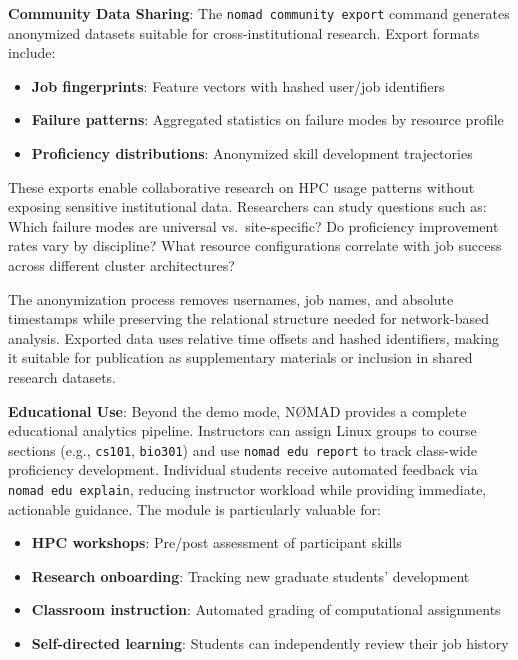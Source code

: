 \documentclass[11pt,a4paper]{article}
\begin{document}
\textbf{Community Data Sharing}: The \texttt{nomad community export} command generates anonymized datasets suitable for cross-institutional research. Export formats include:

\begin{itemize}
\item \textbf{Job fingerprints}: Feature vectors with hashed user/job identifiers
\item \textbf{Failure patterns}: Aggregated statistics on failure modes by resource profile
\item \textbf{Proficiency distributions}: Anonymized skill development trajectories
\end{itemize}

These exports enable collaborative research on HPC usage patterns without exposing sensitive institutional data. Researchers can study questions such as: Which failure modes are universal vs.\ site-specific? Do proficiency improvement rates vary by discipline? What resource configurations correlate with job success across different cluster architectures?

The anonymization process removes usernames, job names, and absolute timestamps while preserving the relational structure needed for network-based analysis. Exported data uses relative time offsets and hashed identifiers, making it suitable for publication as supplementary materials or inclusion in shared research datasets.

\textbf{Educational Use}: Beyond the demo mode, NØMAD provides a complete educational analytics pipeline. Instructors can assign Linux groups to course sections (e.g., \texttt{cs101}, \texttt{bio301}) and use \texttt{nomad edu report} to track class-wide proficiency development. Individual students receive automated feedback via \texttt{nomad edu explain}, reducing instructor workload while providing immediate, actionable guidance. The module is particularly valuable for:

\begin{itemize}
\item \textbf{HPC workshops}: Pre/post assessment of participant skills
\item \textbf{Research onboarding}: Tracking new graduate students' development
\item \textbf{Classroom instruction}: Automated grading of computational assignments
\item \textbf{Self-directed learning}: Students can independently review their job history
\end{itemize}
\end{document}
